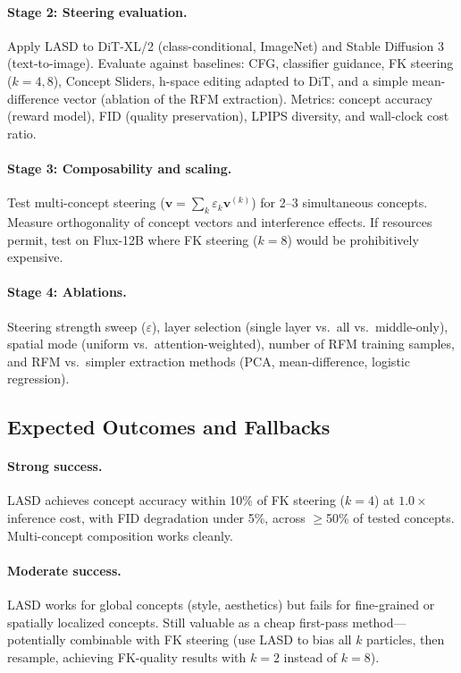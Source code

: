 \documentclass[11pt]{article}
\begin{document}
\paragraph{Stage 2: Steering evaluation.}
Apply LASD to DiT-XL/2 (class-conditional, ImageNet) and Stable Diffusion 3 (text-to-image).
Evaluate against baselines: CFG, classifier guidance, FK steering ($k = 4, 8$), Concept Sliders, h-space editing adapted to DiT, and a simple mean-difference vector (ablation of the RFM extraction).
Metrics: concept accuracy (reward model), FID (quality preservation), LPIPS diversity, and wall-clock cost ratio.

\paragraph{Stage 3: Composability and scaling.}
Test multi-concept steering ($\mathbf{v} = \sum_k \varepsilon_k \mathbf{v}^{(k)}$) for 2--3 simultaneous concepts.
Measure orthogonality of concept vectors and interference effects.
If resources permit, test on Flux-12B where FK steering ($k = 8$) would be prohibitively expensive.

\paragraph{Stage 4: Ablations.}
Steering strength sweep ($\varepsilon$), layer selection (single layer vs.\ all vs.\ middle-only), spatial mode (uniform vs.\ attention-weighted), number of RFM training samples, and RFM vs.\ simpler extraction methods (PCA, mean-difference, logistic regression).

\subsection{Expected Outcomes and Fallbacks}

\paragraph{Strong success.}
LASD achieves concept accuracy within 10\% of FK steering ($k = 4$) at $1.0\times$ inference cost, with FID degradation under 5\%, across $\geq$50\% of tested concepts.
Multi-concept composition works cleanly.

\paragraph{Moderate success.}
LASD works for global concepts (style, aesthetics) but fails for fine-grained or spatially localized concepts.
Still valuable as a cheap first-pass method---potentially combinable with FK steering (use LASD to bias all $k$ particles, then resample, achieving FK-quality results with $k = 2$ instead of $k = 8$).
\end{document}
